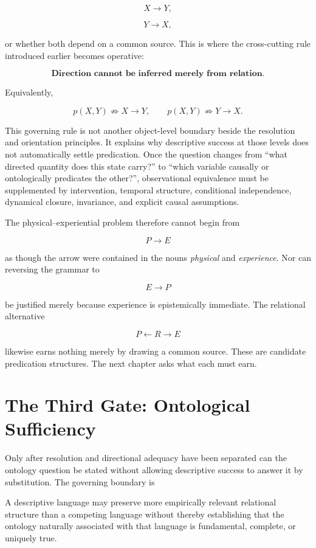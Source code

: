 \[
X\longrightarrow Y,
\]

\[
Y\longrightarrow X,
\]

or whether both depend on a common source. This is where the cross-cutting rule introduced earlier becomes operative:

\[
\boxed{
\textbf{Direction cannot be inferred merely from relation.}
}
\]

Equivalently,

\[
p(X,Y)\nRightarrow X\longrightarrow Y,
\qquad
p(X,Y)\nRightarrow Y\longrightarrow X.
\]

This governing rule is not another object-level boundary beside the resolution and orientation principles. It explains why descriptive success at those levels does not automatically settle predication. Once the question changes from ``what directed quantity does this state carry?'' to ``which variable causally or ontologically predicates the other?'', observational equivalence must be supplemented by intervention, temporal structure, conditional independence, dynamical closure, invariance, and explicit causal assumptions.

The physical--experiential problem therefore cannot begin from

\[
P\longrightarrow E
\]

as though the arrow were contained in the nouns \emph{physical} and \emph{experience}. Nor can reversing the grammar to

\[
E\longrightarrow P
\]

be justified merely because experience is epistemically immediate. The relational alternative

\[
P\longleftarrow R\longrightarrow E
\]

likewise earns nothing merely by drawing a common source. These are candidate predication structures. The next chapter asks what each must earn.

\section{The Third Gate: Ontological Sufficiency}

Only after resolution and directional adequacy have been separated can the ontology question be stated without allowing descriptive success to answer it by substitution. The governing boundary is

\begin{principle}
A descriptive language may preserve more empirically relevant relational structure than a competing language without thereby establishing that the ontology naturally associated with that language is fundamental, complete, or uniquely true.
\end{principle}

